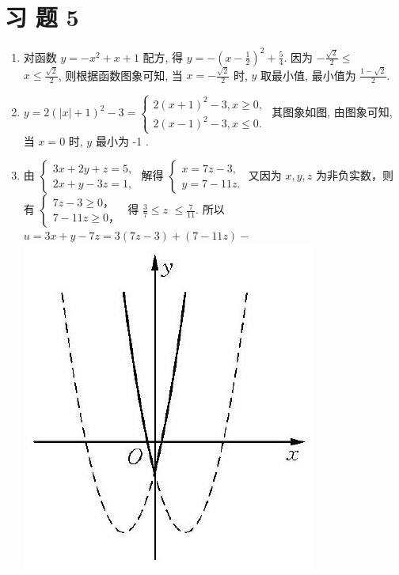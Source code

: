 \documentclass[10pt]{article}
\begin{document}
\section*{习 题 5}
\begin{enumerate}
  \item 对函数 $y=-x^{2}+x+1$ 配方, 得 $y=-\left(x-\frac{1}{2}\right)^{2}+\frac{5}{4}$. 因为 $-\frac{\sqrt{2}}{2} \leqslant$\\
$x \leqslant \frac{\sqrt{2}}{2}$, 则根据函数图象可知, 当 $x=-\frac{\sqrt{2}}{2}$ 时, $y$ 取最小值, 最小值为 $\frac{1-\sqrt{2}}{2}$.
  \item $y=2(|x|+1)^{2}-3=\left\{\begin{array}{l}2(x+1)^{2}-3, x \geqslant 0, \\ 2(x-1)^{2}-3, x \leqslant 0 .\end{array}\right.$ 其图象如图, 由图象可知, 当 $x=0$ 时, $y$ 最小为 -1 .
  \item 由 $\left\{\begin{array}{l}3 x+2 y+z=5, \\ 2 x+y-3 z=1,\end{array}\right.$ 解得 $\left\{\begin{array}{l}x=7 z-3, \\ y=7-11 z .\end{array}\right.$ 又因为 $x, y, z$ 为非负实数，则有 $\left\{\begin{array}{l}7 z-3 \geqslant 0 ， \\ 7-11 z \geqslant 0 ，\end{array}\right.$ 得 $\frac{3}{7} \leqslant z$ $\leqslant \frac{7}{11}$. 所以 $u=3 x+y-7 z=3(7 z-3)+(7-11 z)-$\\
\includegraphics[max width=\textwidth, center]{2024_10_30_1bf34f7aeb61f11d11d3g-121}\\

\end{enumerate}
\end{document}
